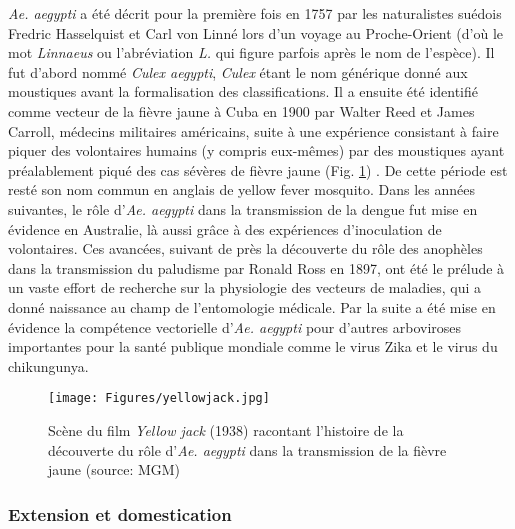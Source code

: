 {\em Ae. aegypti} a été décrit pour la première fois en 1757 par les naturalistes suédois Fredric Hasselquist et Carl von Linné lors d'un voyage au Proche-Orient \cite{iterpalestinum1757} (d'où le mot {\em Linnaeus} ou l'abréviation {\em L.} qui figure parfois après le nom de l'espèce). Il fut d'abord nommé {\em Culex aegypti}, {\em Culex} étant le nom générique donné aux moustiques avant la formalisation des classifications.
Il a ensuite été identifié comme vecteur de la fièvre jaune à Cuba en 1900 par Walter Reed et James Carroll, médecins militaires américains, suite à une expérience consistant à faire piquer des volontaires humains (y compris eux-mêmes) par des moustiques ayant préalablement piqué des cas sévères de fièvre jaune (Fig. \ref{fig:yellowjack}) \cite{tabachnick1991evolutionary}.
De cette période est resté son nom commun en anglais de \guillemotleft yellow fever mosquito\guillemotright.
Dans les années suivantes, le rôle d'{\em Ae. aegypti} dans la transmission de la dengue fut mise en évidence en Australie, là aussi grâce à des expériences d'inoculation de volontaires.
Ces avancées, suivant de près la découverte du rôle des anophèles dans la transmission du paludisme par Ronald Ross en 1897, ont été le prélude à un vaste effort de recherche sur la physiologie des vecteurs de maladies, qui a donné naissance au champ de l'entomologie médicale.
Par la suite a été mise en évidence la compétence vectorielle d'{\em Ae. aegypti} pour d'autres arboviroses importantes pour la santé publique mondiale comme le virus Zika et le virus du chikungunya.

\begin{figure}[t]
	\centering
	\texttt{[image: Figures/yellowjack.jpg]}
	\caption{Scène du film {\em Yellow jack} (1938) racontant l'histoire de la découverte du rôle d'{\em Ae. aegypti} dans la transmission de la fièvre jaune (source: MGM)}
	\label{fig:yellowjack}
\end{figure}



\subsubsection{Extension et domestication}

